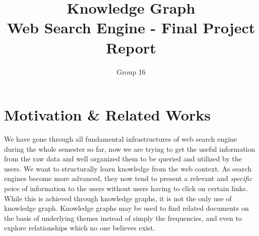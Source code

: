 \documentclass[12pt,twocolumn]{article}
\begin{document}
\baselineskip 16pt
 \newcommand{\la}{\lambda}
 \newcommand{\si}{\sigma}
 \newcommand{\ol}{1-\lambda}
 \newcommand{\be}{\begin{equation}}
 \newcommand{\ee}{\end{equation}}
 \newcommand{\bea}{\begin{eqnarray}}
 \newcommand{\eea}{\end{eqnarray}}

\setlength{\columnsep}{0.8cm}

 \newcommand{\secHead}[1]{{\bf \underline{#1}}\\}

 \newcommand{\mySection}[2]{

\begin{tabular}{l l}
\begin{minipage}[t]{1in}
\sc{#1 }
\end{minipage}

\begin{minipage}[t]{5in}
#2\\
\end{minipage}
\end{tabular}\\\\
}
\singlespacing


\title{Knowledge Graph \\ Web Search Engine - Final Project Report}
\author{Group 16}
\maketitle


\section{Motivation \& Related Works}
We have gone through all fundamental infrastructures of web search engine during the whole semester so far, now we are trying to get the useful information from the raw data and well organized them to be queried and utilized by the users. We want to structurally learn knowledge from the web context. As search engines become more advanced, they now tend to present a relevant and \emph{specific} peice of information to the users without users having to click on certain links. While this is achieved through knowledge graphs, it is not the only use of knowledge graph. Knowledge graphs may be used to find related documents on the basis of underlying themes instead of simply the frequencies, and even to explore relationships which no one believes exist.\\
\end{document}
